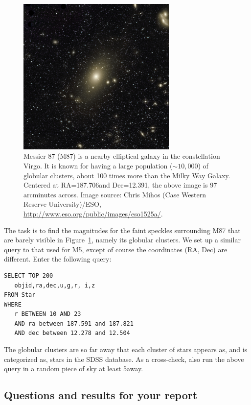 \begin{figure}
	\centering
	\includegraphics[width=0.7\textwidth]{globular-cluster/eso1525a}
	\caption{Messier 87 (M87) is a nearby elliptical galaxy in the constellation Virgo. It is
		known for having a large population ($\sim 10,000$) of globular clusters, about 100 times more
		than the Milky Way Galaxy. Centered at RA=187.706\textdegree and Dec=12.391\textdegree, the above image
		is 97 arcminutes across. Image source: Chris Mihos (Case Western Reserve University)/ESO, \url{http://www.eso.org/public/images/eso1525a/}.}\label{gc:fig:m87}
\end{figure}

The task is to find the magnitudes for the faint speckles surrounding M87 that are barely visible in
Figure~\ref{gc:fig:m87}, namely its globular clusters. We set up a similar query to that used for M5, except
of course the coordinates (RA, Dec) are different. Enter the following query:

\begin{verbatim}
SELECT TOP 200
   objid,ra,dec,u,g,r, i,z
FROM Star
WHERE
   r BETWEEN 10 AND 23
   AND ra between 187.591 and 187.821
   AND dec between 12.278 and 12.504
\end{verbatim}

The globular clusters are so far away that each cluster of stars appears as, and is categorized as, stars in
the SDSS database. As a cross-check, also run the above query in a random piece of sky at least
5\textdegree away.

\subsection{Questions and results for your report}

